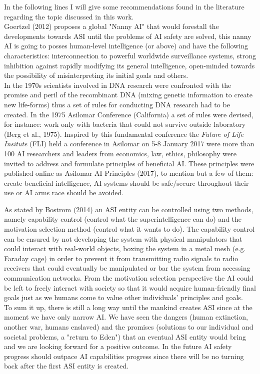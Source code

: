 \documentclass[11pt]{article}
\begin{document}
	\indent
	In the following lines I will give some recommendations found in the literature regarding the topic discussed in this work.\\
	\indent
	Goertzel (2012) proposes a global "Nanny AI" that would forestall the developments towards ASI until the problems of AI safety are solved, this nanny AI is going to posses human-level intelligence (or above) and have the following characteristics: interconnection to powerful worldwide surveillance systems, strong inhibition against rapidly modifying its general intelligence, open-minded towards the possibility of misinterpreting its initial goals and others.  \\
	\indent
	In the 1970s scientists involved in DNA research were confronted with the promise and peril of the recombinant DNA (mixing genetic information to create new life-forms) thus a set of rules for conducting DNA research had to be created. In the 1975 Asilomar Conference (California) a set of rules were devised, for instance: work only with bacteria that could not survive outside laboratory (Berg et al., 1975). Inspired by this fundamental conference the \textit{Future of Life Insitute} (FLI) held a conference in Asilomar on 5-8 January 2017 were more than 100 AI researchers and leaders from economics, law, ethics, philosophy were invited to address and formulate principles of beneficial AI. These principles were published online  as Asilomar AI Principles (2017), to mention but a few of them: create beneficial intelligence, AI systems should be safe/secure throughout their use or AI arms race should be avoided.  
	
	\indent
	As stated by Bostrom (2014) an ASI entity can be controlled using two methods, namely capability control (control what the superintelligence can do) and the  motivation selection method (control what it wants to do). The capability control can be ensured by not developing the system with physical manipulators that could interact with real-world objects, boxing the system in a metal mesh (e.g. Faraday cage) in order to prevent it from transmitting radio signals to radio receivers that could eventually be manipulated or bar the system from accessing communication networks. From the motivation selection perspective the AI could be left to freely interact with society so that it would acquire human-friendly final goals just as we humans come to value other individuals' principles and goals.\\

\indent 
	To sum it up, there is still a long way until the mankind creates ASI since at the moment we have only narrow AI. We have seen the dangers (human extinction, another war, humans enslaved) and the promises (solutions to our individual and societal problems, a "return to Eden") that an eventual ASI entity would bring and we are looking forward for a positive outcome.
In the future AI safety progress should outpace AI capabilities progress since there will be no turning back after the first ASI entity is created.\\
\end{document}
